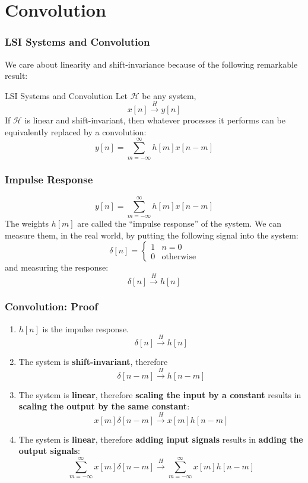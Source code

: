 \documentclass{beamer}
\begin{document}
\section[Convolution]{Convolution}
\setcounter{subsection}{1}

\begin{frame}
  \frametitle{LSI Systems and Convolution}

  We care about linearity and shift-invariance because of the
  following remarkable result:
  \begin{block}{LSI Systems and Convolution}
    Let ${\mathcal H}$ be any system,
    \[
    x[n]\stackrel{H}{\longrightarrow} y[n]
    \]
    If ${\mathcal H}$ is linear and shift-invariant, then whatever
    processes it performs can be equivalently replaced by a convolution:
    \[
    y[n] = \sum_{m=-\infty}^\infty h[m] x[n-m]
    \]
  \end{block}
\end{frame}

\begin{frame}
  \frametitle{Impulse Response}

  \[
  y[n] = \sum_{m=-\infty}^\infty h[m] x[n-m]
  \]
  The weights $h[m]$ are called the ``impulse response'' of the system.  We can
  measure them, in the real world, by putting the following signal into the system:
  \[
  \delta[n] = \begin{cases}
    1 & n=0\\
    0 & \mbox{otherwise}
  \end{cases}
  \]
  and measuring the response:
  \[
  \delta[n] \stackrel{H}{\longrightarrow} h[n]
  \]
\end{frame}



\begin{frame}
  \frametitle{Convolution: Proof}
  \begin{enumerate}
  \item $h[n]$ is the impulse response.
    \[
    \delta[n] \stackrel{H}{\longrightarrow} h[n]
    \]
  \item The system is {\bf shift-invariant}, therefore
    \[
    \delta[n-m] \stackrel{H}{\longrightarrow} h[n-m]
    \]
  \item The system is {\bf linear}, therefore {\bf scaling the input
    by a constant} results in {\bf scaling the output by the same
    constant}:
    \[
    x[m]\delta[n-m] \stackrel{H}{\longrightarrow} x[m]h[n-m]
    \]
  \item The system is {\bf linear}, therefore {\bf adding input
    signals} results in {\bf adding the output signals}:
    \[
    \sum_{m=-\infty}^\infty x[m]\delta[n-m] \stackrel{H}{\longrightarrow} \sum_{m=-\infty}^\infty x[m]h[n-m]
    \]
  \end{enumerate}
\end{frame}
\end{document}
